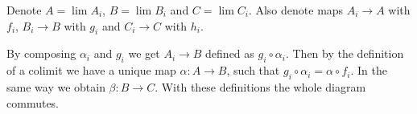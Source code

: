 \begin{exercise}{1}
\begin{enumerate}
{                %





            }
    \end{enumerate}
\end{exercise}

\begin{exercise}{2}
    Denote $A = \lim A_i$, $B = \lim B_i$ and $C = \lim C_i$. Also denote maps
    $A_i \rightarrow A$ with $f_i$, $B_i \rightarrow B$ with $g_i$ and $C_i
    \rightarrow C$ with $h_i$.

    By composing $\alpha_i$ and $g_i$ we get $A_i \rightarrow B$ defined as $g_i
    \circ \alpha_i$. Then by the definition of a colimit we have a unique map $\alpha:A
    \rightarrow B$, such that $g_i \circ \alpha_i = \alpha
    \circ f_i$. In the same way we obtain $\beta \colon B \rightarrow C$. With
    these definitions the whole diagram commutes.
\end{exercise}

